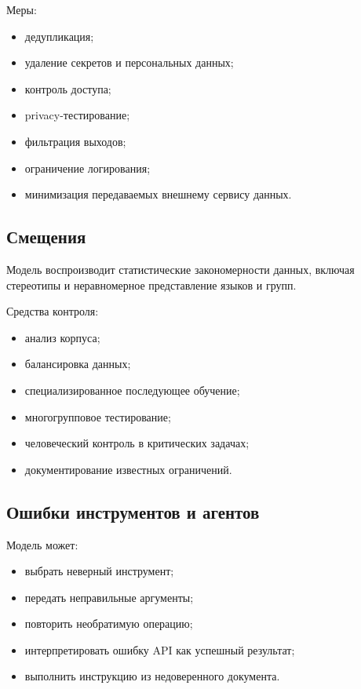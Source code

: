 \documentclass[12pt,a4paper]{article}
\newcommand{\1}{\mathbf{1}}
\theoremstyle{definition}
\theoremstyle{remark}
\begin{document}
Меры:

\begin{itemize}
    \item дедупликация;
    \item удаление секретов и персональных данных;
    \item контроль доступа;
    \item privacy-тестирование;
    \item фильтрация выходов;
    \item ограничение логирования;
    \item минимизация передаваемых внешнему сервису данных.
\end{itemize}

\subsection{Смещения}

Модель воспроизводит статистические закономерности данных, включая
стереотипы и неравномерное представление языков и групп.

Средства контроля:

\begin{itemize}
    \item анализ корпуса;
    \item балансировка данных;
    \item специализированное последующее обучение;
    \item многогрупповое тестирование;
    \item человеческий контроль в критических задачах;
    \item документирование известных ограничений.
\end{itemize}

\subsection{Ошибки инструментов и агентов}

Модель может:

\begin{itemize}
    \item выбрать неверный инструмент;
    \item передать неправильные аргументы;
    \item повторить необратимую операцию;
    \item интерпретировать ошибку API как успешный результат;
    \item выполнить инструкцию из недоверенного документа.
\end{itemize}
\end{document}

